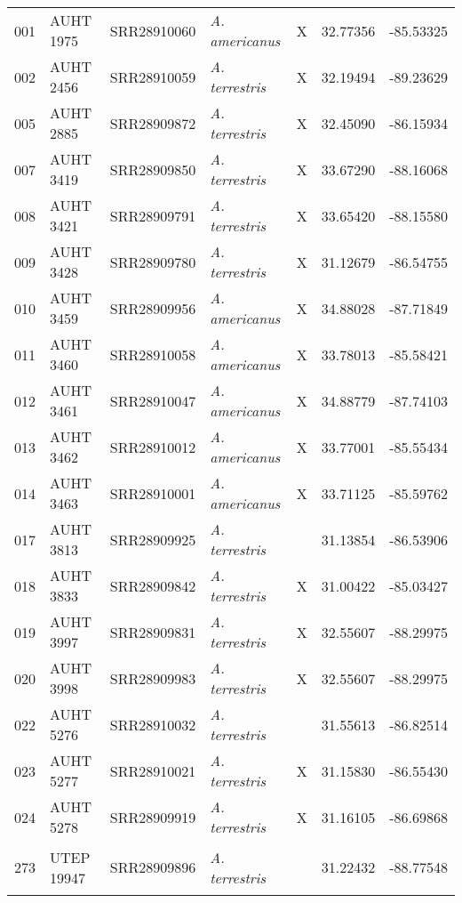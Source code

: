 \begin{longtable}{ lllllll }
001 & AUHT 1975 & SRR28910060 & \textit{A. americanus} & X & 32.77356 & -85.53325 \\ 
002 & AUHT 2456 & SRR28910059 & \textit{A. terrestris} & X & 32.19494 & -89.23629 \\ 
005 & AUHT 2885 & SRR28909872 & \textit{A. terrestris} & X & 32.45090 & -86.15934 \\ 
007 & AUHT 3419 & SRR28909850 & \textit{A. terrestris} & X & 33.67290 & -88.16068 \\ 
008 & AUHT 3421 & SRR28909791 & \textit{A. terrestris} & X & 33.65420 & -88.15580 \\ 
009 & AUHT 3428 & SRR28909780 & \textit{A. terrestris} & X & 31.12679 & -86.54755 \\ 
010 & AUHT 3459 & SRR28909956 & \textit{A. americanus} & X & 34.88028 & -87.71849 \\ 
011 & AUHT 3460 & SRR28910058 & \textit{A. americanus} & X & 33.78013 & -85.58421 \\ 
012 & AUHT 3461 & SRR28910047 & \textit{A. americanus} & X & 34.88779 & -87.74103 \\ 
013 & AUHT 3462 & SRR28910012 & \textit{A. americanus} & X & 33.77001 & -85.55434 \\ 
014 & AUHT 3463 & SRR28910001 & \textit{A. americanus} & X & 33.71125 & -85.59762 \\ 
017 & AUHT 3813 & SRR28909925 & \textit{A. terrestris} &  & 31.13854 & -86.53906 \\ 
018 & AUHT 3833 & SRR28909842 & \textit{A. terrestris} & X & 31.00422 & -85.03427 \\ 
019 & AUHT 3997 & SRR28909831 & \textit{A. terrestris} & X & 32.55607 & -88.29975 \\ 
020 & AUHT 3998 & SRR28909983 & \textit{A. terrestris} & X & 32.55607 & -88.29975 \\ 
022 & AUHT 5276 & SRR28910032 & \textit{A. terrestris} &  & 31.55613 & -86.82514 \\ 
023 & AUHT 5277 & SRR28910021 & \textit{A. terrestris} & X & 31.15830 & -86.55430 \\ 
024 & AUHT 5278 & SRR28909919 & \textit{A. terrestris} & X & 31.16105 & -86.69868 \\ 
273 & UTEP 19947 & SRR28909896 & \textit{A. terrestris} &  & 31.22432 & -88.77548

\label{table:loanedHyb}
\end{longtable}